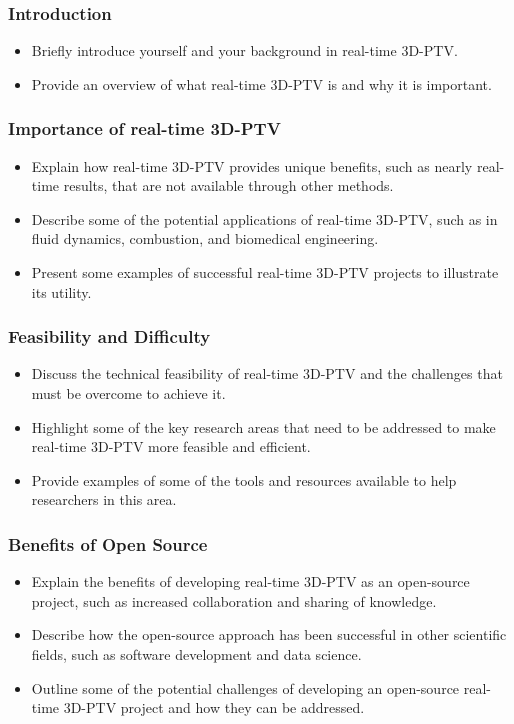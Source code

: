 \documentclass{beamer}
\begin{document}
\begin{frame}
\frametitle{Introduction}
\begin{itemize}
\item Briefly introduce yourself and your background in real-time 3D-PTV.
\item Provide an overview of what real-time 3D-PTV is and why it is important.
\end{itemize}
\end{frame}

\begin{frame}
\frametitle{Importance of real-time 3D-PTV}
\begin{itemize}
\item Explain how real-time 3D-PTV provides unique benefits, such as nearly real-time results, that are not available through other methods.
\item Describe some of the potential applications of real-time 3D-PTV, such as in fluid dynamics, combustion, and biomedical engineering.
\item Present some examples of successful real-time 3D-PTV projects to illustrate its utility.
\end{itemize}
\end{frame}

\begin{frame}
\frametitle{Feasibility and Difficulty}
\begin{itemize}
\item Discuss the technical feasibility of real-time 3D-PTV and the challenges that must be overcome to achieve it.
\item Highlight some of the key research areas that need to be addressed to make real-time 3D-PTV more feasible and efficient.
\item Provide examples of some of the tools and resources available to help researchers in this area.
\end{itemize}
\end{frame}

\begin{frame}
\frametitle{Benefits of Open Source}
\begin{itemize}
\item Explain the benefits of developing real-time 3D-PTV as an open-source project, such as increased collaboration and sharing of knowledge.
\item Describe how the open-source approach has been successful in other scientific fields, such as software development and data science.
\item Outline some of the potential challenges of developing an open-source real-time 3D-PTV project and how they can be addressed.
\end{itemize}
\end{frame}
\end{document}
